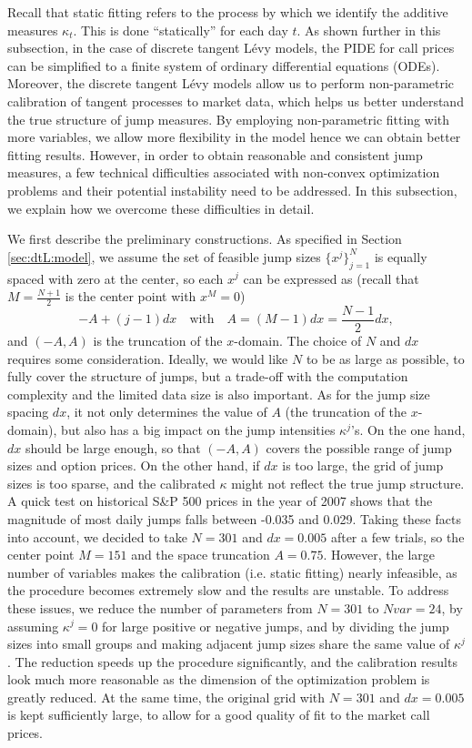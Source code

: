 \documentclass{article}
\numberwithin{equation}{section}
\begin{document}
Recall that static fitting refers to the process by which we identify the additive measures $\kappa_t$. This is done ``statically'' for each day $t$.
As shown further in this subsection, in the case of discrete tangent L\'{e}vy models, the PIDE for call prices can be simplified to a finite system of ordinary differential equations (ODEs). Moreover, the discrete tangent L\'{e}vy models allow us to perform non-parametric calibration of tangent processes to market data, which helps us better understand the true structure of jump measures. By employing non-parametric fitting with more variables, we allow more flexibility in the model hence we can obtain better fitting results. However, in order to obtain reasonable and consistent jump measures, a few technical difficulties associated with non-convex optimization problems and their potential instability need to be addressed. In this subsection, we explain how we overcome these difficulties in detail.


We first describe the preliminary constructions. As specified in Section \ref{sec:dtL:model}, we assume the set of feasible jump sizes $\{x^j\}_{j=1}^N$ is equally spaced with zero at the center, so each $x^j$ can be expressed as (recall that $M = \frac{N+1}{2}$ is the center point with $x^M = 0$)
\begin{equation*}
-A + (j-1)dx \quad \text{with} \quad A = (M-1)dx = \frac{N-1}{2}dx,
\end{equation*}
and $(-A, A)$ is the truncation of the $x$-domain.
The choice of $N$ and $dx$ requires some consideration. Ideally, we would like $N$ to be as large as possible, to fully cover the structure of jumps, but a trade-off with the computation complexity and the limited data size is also important. As for the jump size spacing $dx$, it not only determines the value of $A$ (the truncation of the $x$-domain), but also has a big impact on the jump intensities $\kappa^j$'s. On the one hand, $dx$ should be large enough, so that $(-A, A)$ covers the possible range of jump sizes and option prices. On the other hand, if $dx$ is too large, the grid of jump sizes is too sparse, and the calibrated $\kappa$ might not reflect the true jump structure. A quick test on historical S\&P 500 prices in the year of 2007 shows that the magnitude of most daily jumps falls between -0.035 and 0.029. Taking these facts into account, we decided to take $N = 301$ and $dx = 0.005$ after a few trials, so the center point $M = 151$ and the space truncation $A = 0.75$.
However, the large number of variables makes the calibration (i.e. static fitting) nearly infeasible, as the procedure becomes extremely slow and the results are unstable. To address these issues, we reduce the number of parameters from $N=301$ to $Nvar = 24$, by assuming $\kappa^j = 0$ for large positive or negative jumps,  and by dividing the jump sizes into small groups and making adjacent jump sizes share the same value of $\kappa^j$. 
The reduction speeds up the procedure significantly, and the calibration results look much more reasonable as the dimension of the optimization problem is greatly reduced. At the same time, the original grid with $N = 301$ and $dx = 0.005$ is kept sufficiently large, to allow for a good quality of fit to the market call prices. 
\end{document}
